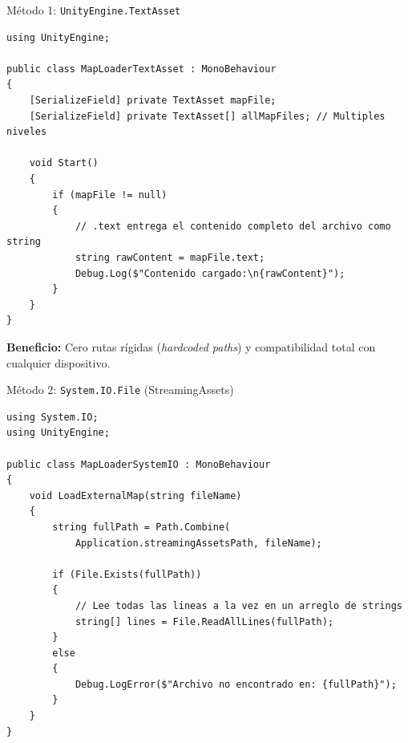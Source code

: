 \documentclass{beamer}
\begin{document}
\begin{frame}[fragile]{M\'etodo 1: \texttt{UnityEngine.TextAsset}}
\lstset{style=CSharpStyle}
\begin{lstlisting}
using UnityEngine;

public class MapLoaderTextAsset : MonoBehaviour
{
    [SerializeField] private TextAsset mapFile;
    [SerializeField] private TextAsset[] allMapFiles; // Multiples niveles

    void Start()
    {
        if (mapFile != null)
        {
            // .text entrega el contenido completo del archivo como string
            string rawContent = mapFile.text;
            Debug.Log($"Contenido cargado:\n{rawContent}");
        }
    }
}
\end{lstlisting}

\vspace{0.2cm}
\textbf{Beneficio:} Cero rutas r\'igidas (\textit{hardcoded paths}) y compatibilidad total con cualquier dispositivo.
\end{frame}

\begin{frame}[fragile]{M\'etodo 2: \texttt{System.IO.File} (StreamingAssets)}
\lstset{style=CSharpStyle}
\begin{lstlisting}
using System.IO;
using UnityEngine;

public class MapLoaderSystemIO : MonoBehaviour
{
    void LoadExternalMap(string fileName)
    {
        string fullPath = Path.Combine(
            Application.streamingAssetsPath, fileName);

        if (File.Exists(fullPath))
        {
            // Lee todas las lineas a la vez en un arreglo de strings
            string[] lines = File.ReadAllLines(fullPath);
        }
        else
        {
            Debug.LogError($"Archivo no encontrado en: {fullPath}");
        }
    }
}
\end{lstlisting}
\end{frame}
\end{document}
